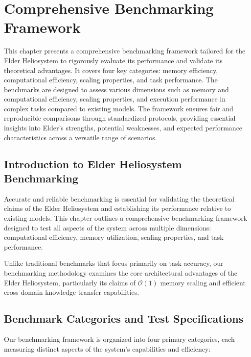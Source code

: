 \chapter{Comprehensive Benchmarking Framework}

\begin{tcolorbox}[colback=PureBlue!5!white,colframe=PureBlue!75!black,title=Chapter Summary]
This chapter presents a comprehensive benchmarking framework tailored for the Elder Heliosystem to rigorously evaluate its performance and validate its theoretical advantages. It covers four key categories: memory efficiency, computational efficiency, scaling properties, and task performance. The benchmarks are designed to assess various dimensions such as memory and computational efficiency, scaling properties, and execution performance in complex tasks compared to existing models. The framework ensures fair and reproducible comparisons through standardized protocols, providing essential insights into Elder's strengths, potential weaknesses, and expected performance characteristics across a versatile range of scenarios.
\end{tcolorbox}

\section{Introduction to Elder Heliosystem Benchmarking}

Accurate and reliable benchmarking is essential for validating the theoretical claims of the Elder Heliosystem and establishing its performance relative to existing models. This chapter outlines a comprehensive benchmarking framework designed to test all aspects of the system across multiple dimensions: computational efficiency, memory utilization, scaling properties, and task performance. 

Unlike traditional benchmarks that focus primarily on task accuracy, our benchmarking methodology examines the core architectural advantages of the Elder Heliosystem, particularly its claims of $\mathcal{O}(1)$ memory scaling and efficient cross-domain knowledge transfer capabilities.

\section{Benchmark Categories and Test Specifications}

Our benchmarking framework is organized into four primary categories, each measuring distinct aspects of the system's capabilities and efficiency:


